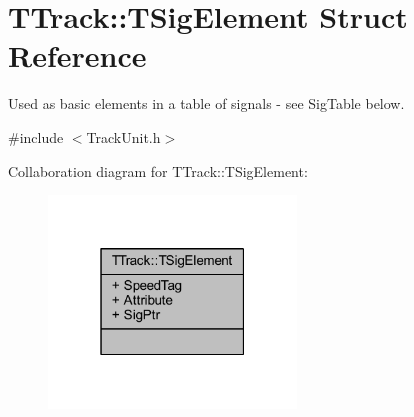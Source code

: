 \hypertarget{struct_t_track_1_1_t_sig_element}{}\section{T\+Track\+:\+:T\+Sig\+Element Struct Reference}
\label{struct_t_track_1_1_t_sig_element}


Used as basic elements in a table of signals -\/ see Sig\+Table below.  




{\ttfamily \#include $<$Track\+Unit.\+h$>$}



Collaboration diagram for T\+Track\+:\+:T\+Sig\+Element\+:\nopagebreak
\begin{figure}[H]
\begin{center}
\leavevmode
\includegraphics[width=187pt]{struct_t_track_1_1_t_sig_element__coll__graph}
\end{center}
\end{figure}
